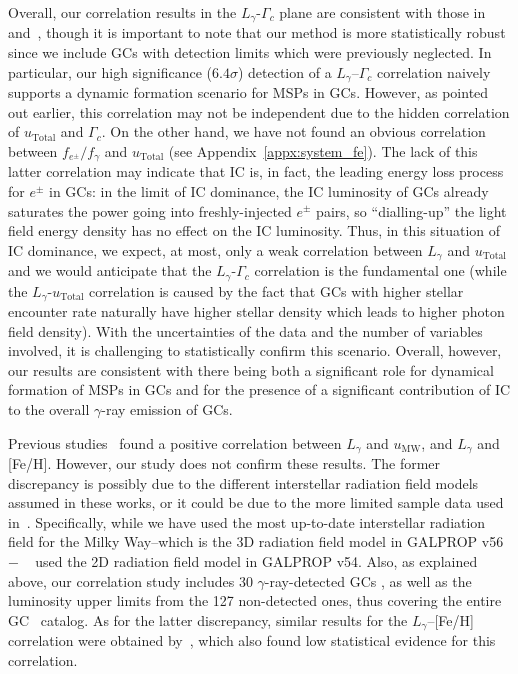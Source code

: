 \documentclass[doublespace,nopageskip]{VTthesis} %
\begin{document}
Overall, our correlation results in the $L_\gamma$-$\Gamma_c$ plane are consistent with those in \citet{2011ApJ...726..100H} and~\citet{2019MNRAS.486..851D}, though it is important to note that our method is more statistically robust since we include GCs with detection limits which were previously neglected. In particular, our high significance ($6.4\sigma$) detection of a $L_\gamma$--$\Gamma_c$ correlation naively supports a dynamic formation scenario for MSPs in GCs. However, as pointed out earlier, this correlation may not be independent due to the hidden correlation of $u_\mathrm{Total}$ and $\Gamma_c$. On the other hand, we have not found an obvious correlation between $f_{e^\pm}/f_\gamma$ and $u_\mathrm{Total}$ (see Appendix~\ref{appx:system_fe}). The lack of this latter correlation may indicate that IC is, in fact, the leading energy loss process for $e^\pm$ in GCs: in the limit of IC dominance, the IC luminosity of GCs already saturates the power going into freshly-injected $e^\pm$ pairs, so ``dialling-up'' the light field energy density has no effect on the IC luminosity. Thus, in this situation of IC dominance, we expect, at most, only a weak correlation between $L_\gamma$ and $u_\mathrm{Total}$ and we would anticipate that the $L_\gamma$-$\Gamma_c$ correlation is the fundamental one (while the $L_\gamma$-$u_\mathrm{Total}$ correlation is caused by the fact that GCs with higher stellar encounter rate naturally have higher stellar density which leads to higher photon field density). With the uncertainties of the data and the number of variables involved, it is challenging to statistically confirm this scenario. Overall, however, our results are consistent with there being both a significant role for dynamical formation of MSPs in GCs and for the presence of a significant contribution of IC to the overall $\gamma$-ray emission of GCs.

Previous studies~\citep{2011ApJ...726..100H} found a positive correlation between $L_\gamma$ and $u_\mathrm{MW}$, and $L_\gamma$ and [Fe/H]. However, our study does not confirm these results. The former discrepancy is possibly due to the different interstellar radiation field models assumed in these works, or it could be due to the more limited sample data used in~\cite{2011ApJ...726..100H}. Specifically, while we have used the most up-to-date interstellar radiation field for the Milky Way--which is the 3D radiation field model in GALPROP v56~\citep{2017ApJ...846...67P}$-$ ~\citet{2011ApJ...726..100H} used the 2D radiation field model in GALPROP v54. Also, as explained above, our correlation study includes 30 $\gamma$-ray-detected GCs , as well as the luminosity upper limits from the 127 non-detected ones, thus covering the entire GC~\citet{1996AJ....112.1487H} catalog. As for the latter discrepancy, similar results for the $L_\gamma$--[Fe/H] correlation were obtained by~\citet{2019MNRAS.486..851D}, which also found low statistical evidence for this correlation.
\end{document}
